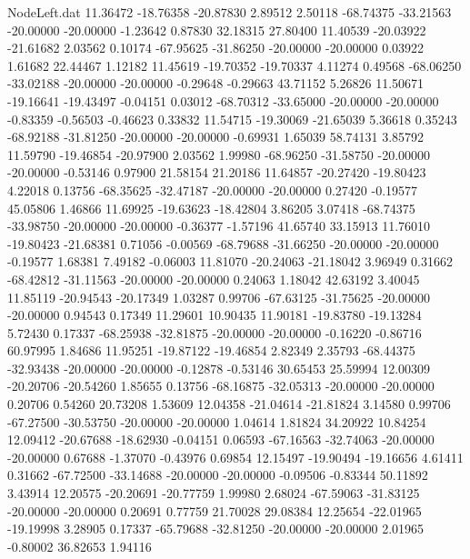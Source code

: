 \begin{filecontents}{NodeLeft.dat}
  11.36472  -18.76358  -20.87830     2.89512    2.50118  -68.74375  -33.21563  -20.00000  -20.00000   -1.23642    0.87830   32.18315   27.80400
  11.40539  -20.03922  -21.61682     2.03562    0.10174  -67.95625  -31.86250  -20.00000  -20.00000    0.03922    1.61682   22.44467    1.12182
  11.45619  -19.70352  -19.70337     4.11274    0.49568  -68.06250  -33.02188  -20.00000  -20.00000   -0.29648   -0.29663   43.71152    5.26826
  11.50671  -19.16641  -19.43497    -0.04151    0.03012  -68.70312  -33.65000  -20.00000  -20.00000   -0.83359   -0.56503   -0.46623    0.33832
  11.54715  -19.30069  -21.65039     5.36618    0.35243  -68.92188  -31.81250  -20.00000  -20.00000   -0.69931    1.65039   58.74131    3.85792
  11.59790  -19.46854  -20.97900     2.03562    1.99980  -68.96250  -31.58750  -20.00000  -20.00000   -0.53146    0.97900   21.58154   21.20186
  11.64857  -20.27420  -19.80423     4.22018    0.13756  -68.35625  -32.47187  -20.00000  -20.00000    0.27420   -0.19577   45.05806    1.46866
  11.69925  -19.63623  -18.42804     3.86205    3.07418  -68.74375  -33.98750  -20.00000  -20.00000   -0.36377   -1.57196   41.65740   33.15913
  11.76010  -19.80423  -21.68381     0.71056   -0.00569  -68.79688  -31.66250  -20.00000  -20.00000   -0.19577    1.68381    7.49182   -0.06003
  11.81070  -20.24063  -21.18042     3.96949    0.31662  -68.42812  -31.11563  -20.00000  -20.00000    0.24063    1.18042   42.63192    3.40045
  11.85119  -20.94543  -20.17349     1.03287    0.99706  -67.63125  -31.75625  -20.00000  -20.00000    0.94543    0.17349   11.29601   10.90435
  11.90181  -19.83780  -19.13284     5.72430    0.17337  -68.25938  -32.81875  -20.00000  -20.00000   -0.16220   -0.86716   60.97995    1.84686
  11.95251  -19.87122  -19.46854     2.82349    2.35793  -68.44375  -32.93438  -20.00000  -20.00000   -0.12878   -0.53146   30.65453   25.59994
  12.00309  -20.20706  -20.54260     1.85655    0.13756  -68.16875  -32.05313  -20.00000  -20.00000    0.20706    0.54260   20.73208    1.53609
  12.04358  -21.04614  -21.81824     3.14580    0.99706  -67.27500  -30.53750  -20.00000  -20.00000    1.04614    1.81824   34.20922   10.84254
  12.09412  -20.67688  -18.62930    -0.04151    0.06593  -67.16563  -32.74063  -20.00000  -20.00000    0.67688   -1.37070   -0.43976    0.69854
  12.15497  -19.90494  -19.16656     4.61411    0.31662  -67.72500  -33.14688  -20.00000  -20.00000   -0.09506   -0.83344   50.11892    3.43914
  12.20575  -20.20691  -20.77759     1.99980    2.68024  -67.59063  -31.83125  -20.00000  -20.00000    0.20691    0.77759   21.70028   29.08384
  12.25654  -22.01965  -19.19998     3.28905    0.17337  -65.79688  -32.81250  -20.00000  -20.00000    2.01965   -0.80002   36.82653    1.94116

\end{filecontents}
